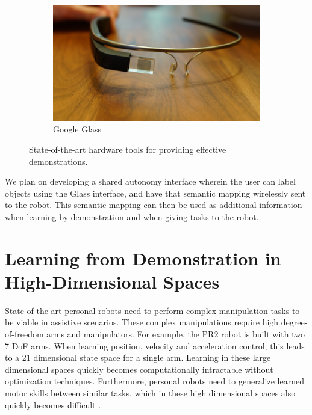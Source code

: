 \documentclass{acm_proc_article-sp}
\begin{document}
\begin{figure}
\begin{subfigure}{0.25\columnwidth}
\includegraphics[width=1.0\columnwidth]{Google_Glass_Explorer_Edition}
\caption{Google Glass}
\label{Glass}
\end{subfigure}
\caption{State-of-the-art hardware tools for providing effective demonstrations.}
\end{figure}

We plan on developing a shared autonomy interface wherein the user can label objects using the Glass interface, and have that semantic mapping wirelessly sent to the robot. This semantic mapping can then be used as additional information when learning by demonstration and when giving tasks to the robot.


\section{Learning from Demonstration in High-Dimensional Spaces}
State-of-the-art personal robots need to perform complex manipulation tasks to be viable in assistive scenarios. These complex manipulations require high degree-of-freedom arms and manipulators. For example, the PR2 robot is built with two 7 DoF arms. When learning position, velocity and acceleration control, this leads to a 21 dimensional state space for a single arm. Learning in these large dimensional spaces quickly becomes computationally intractable without optimization techniques. Furthermore, personal robots need to generalize learned motor skills between similar tasks, which in these high dimensional spaces also quickly becomes difficult \cite{Pastor_ICRA_2009}.
\end{document}
